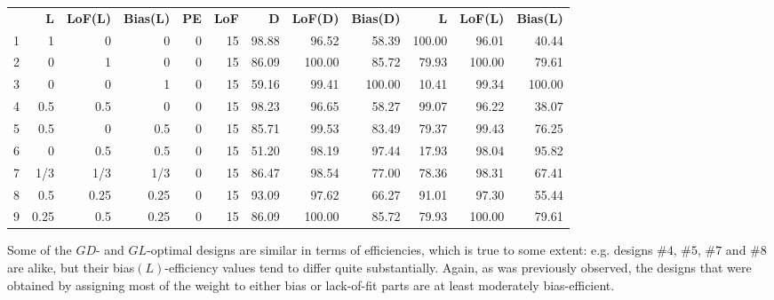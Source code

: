 \begin{table}[h]
{\begin{tabular}{rrrrrrrrrrrr}
   & \textbf{L}       & \textbf{LoF(L)}    & \textbf{Bias(L)}   & \textbf{PE}        & \textbf{LoF}        & \textbf{D}   & \textbf{LoF(D)}   & \textbf{Bias(D)}  & \textbf{L}       & \textbf{LoF(L)}   & \textbf{Bias(L)}  \\
1 & 1 & 0 & 0 & \multicolumn{1}{|r}{0} & 15 & \multicolumn{1}{|r}{98.88} & 96.52 & 58.39 & \multicolumn{1}{|r}{100.00} & 96.01 & 40.44 \\
2 & 0 & 1 & 0 & \multicolumn{1}{|r}{0} & 15 & \multicolumn{1}{|r}{86.09} & 100.00 & 85.72 & \multicolumn{1}{|r}{79.93} & 100.00 & 79.61 \\
3 & 0 & 0 & 1 & \multicolumn{1}{|r}{0} & 15 & \multicolumn{1}{|r}{59.16} & 99.41 & 100.00 & \multicolumn{1}{|r}{10.41} & 99.34 & 100.00 \\
4 & 0.5 & 0.5 & 0 & \multicolumn{1}{|r}{0} & 15 & \multicolumn{1}{|r}{98.23} & 96.65 & 58.27 & \multicolumn{1}{|r}{99.07} & 96.22 & 38.07 \\
5 & 0.5 & 0 & 0.5 & \multicolumn{1}{|r}{0} & 15 & \multicolumn{1}{|r}{85.71} & 99.53 & 83.49 & \multicolumn{1}{|r}{79.37} & 99.43 & 76.25 \\
6 & 0 & 0.5 & 0.5 & \multicolumn{1}{|r}{0} & 15 & \multicolumn{1}{|r}{51.20} & 98.19 & 97.44 & \multicolumn{1}{|r}{17.93} & 98.04 & 95.82 \\
7 & 1/3 & 1/3 & 1/3 & \multicolumn{1}{|r}{0} & 15 & \multicolumn{1}{|r}{86.47} & 98.54 & 77.00 & \multicolumn{1}{|r}{78.36} & 98.31 & 67.41 \\
8 & 0.5 & 0.25 & 0.25 & \multicolumn{1}{|r}{0} & 15 & \multicolumn{1}{|r}{93.09} & 97.62 & 66.27 & \multicolumn{1}{|r}{91.01} & 97.30 & 55.44 \\
9 & 0.25 & 0.5 & 0.25 & \multicolumn{1}{|r}{0} & 15 & \multicolumn{1}{|r}{86.09} & 100.00 & 85.72 & \multicolumn{1}{|r}{79.93} & 100.00 & 79.61
\end{tabular}
}
\end{table}

Some of the $GD$- and $GL$-optimal designs are similar in terms of efficiencies, which is true to some extent: e.g. designs \#$4$, \#$5$, \#$7$ and \#$8$ are alike, but their bias$(L)$-efficiency values tend to differ quite substantially. Again, as was previously observed, the designs that were obtained by assigning most of the weight to either bias or lack-of-fit parts are at least moderately bias-efficient.

